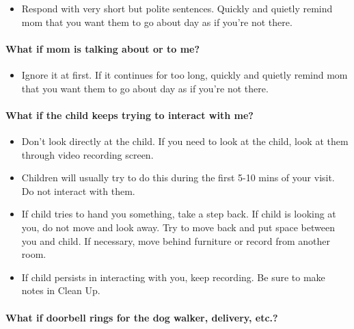 \documentclass[
  12pt,
]{book}
\providecommand{\tightlist}{%
  \setlength{\itemsep}{0pt}\setlength{\parskip}{0pt}}
\begin{document}
\begin{itemize}
\tightlist
\item
  Respond with very short but polite sentences. Quickly and quietly remind mom that you want them to go about day as if you're not there.
\end{itemize}

\hypertarget{what-if-mom-is-talking-about-or-to-me}{%
\paragraph*{What if mom is talking about or to me?}\label{what-if-mom-is-talking-about-or-to-me}}

\begin{itemize}
\tightlist
\item
  Ignore it at first. If it continues for too long, quickly and quietly remind mom that you want them to go about day as if you're not there.
\end{itemize}

\hypertarget{what-if-the-child-keeps-trying-to-interact-with-me}{%
\paragraph*{What if the child keeps trying to interact with me?}\label{what-if-the-child-keeps-trying-to-interact-with-me}}

\begin{itemize}
\tightlist
\item
  Don't look directly at the child. If you need to look at the child, look at them through video recording screen.
\item
  Children will usually try to do this during the first 5-10 mins of your visit. Do not interact with them.
\item
  If child tries to hand you something, take a step back. If child is looking at you, do not move and look away. Try to move back and put space between you and child. If necessary, move behind furniture or record from another room.
\item
  If child persists in interacting with you, keep recording. Be sure to make notes in Clean Up.
\end{itemize}

\hypertarget{what-if-doorbell-rings-for-the-dog-walker-delivery-etc.}{%
\paragraph*{What if doorbell rings for the dog walker, delivery, etc.?}\label{what-if-doorbell-rings-for-the-dog-walker-delivery-etc.}}
\end{document}
